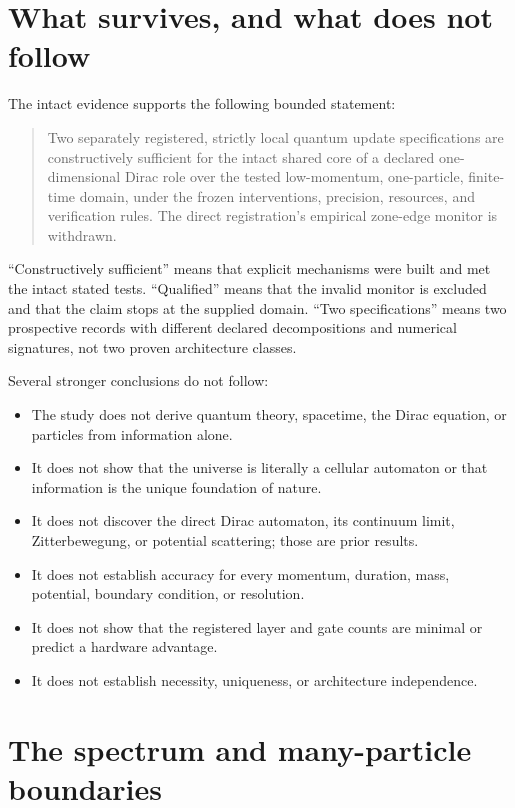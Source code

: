\documentclass[11pt]{article}
\begin{document}
\section{What survives, and what does not follow}

The intact evidence supports the following bounded statement:

\begin{quote}
Two separately registered, strictly local quantum update specifications are
constructively sufficient for the intact shared core of a declared
one-dimensional Dirac role over the tested low-momentum, one-particle,
finite-time domain, under the frozen interventions, precision, resources, and
verification rules.  The direct registration's empirical zone-edge monitor is
withdrawn.
\end{quote}

``Constructively sufficient'' means that explicit mechanisms were built and
met the intact stated tests.  ``Qualified'' means that the invalid monitor is excluded
and that the claim stops at the supplied domain.  ``Two specifications'' means
two prospective records with different declared decompositions and numerical
signatures, not two proven architecture classes.

Several stronger conclusions do not follow:

\begin{itemize}
  \item The study does not derive quantum theory, spacetime, the Dirac
  equation, or particles from information alone.
  \item It does not show that the universe is literally a cellular automaton
  or that information is the unique foundation of nature.
  \item It does not discover the direct Dirac automaton, its continuum limit,
  Zitterbewegung, or potential scattering; those are prior results.
  \item It does not establish accuracy for every momentum, duration, mass,
  potential, boundary condition, or resolution.
  \item It does not show that the registered layer and gate counts are minimal
  or predict a hardware advantage.
  \item It does not establish necessity, uniqueness, or architecture
  independence.
\end{itemize}

\section{The spectrum and many-particle boundaries}
\end{document}
